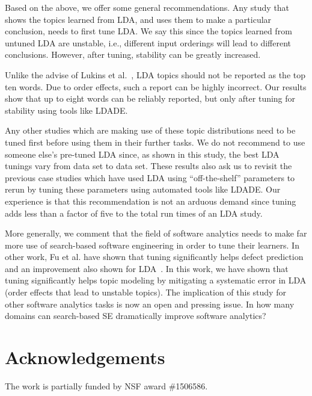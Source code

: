 \documentclass[twocolumn,5p,sort&compress]{elsarticle}
\theoremstyle{break}
\begin{document}
Based on the above, we offer some general recommendations. Any study that shows the topics learned from LDA, and uses them to make a particular
conclusion, needs to first tune LDA. We say this since the topics learned from untuned LDA are unstable, i.e., different input orderings will lead to different conclusions. However, after tuning, stability can be greatly increased.

Unlike the advise of Lukins et al.~\cite{lukins2010bug}, LDA topics should not be reported as the top ten words.
  Due to order effects, such a report can be highly incorrect.
  Our results show that up to eight words can be reliably reported, but only
  after tuning for stability using tools like LDADE.

Any other studies which are making use of these topic distributions need to be tuned first before using them in their further tasks. We do not recommend to use someone else's pre-tuned LDA since, as shown in this study,  the best LDA tunings vary from data set to data set. These results also ask us to revisit the previous case studies which have used LDA using ``off-the-shelf'' parameters to rerun by tuning these parameters using automated tools like LDADE. Our experience is that this recommendation is not an arduous demand since tuning adds less than a factor of five to the total run times of an LDA study.

More generally, we comment that the field of software analytics needs to make far more use of search-based software engineering in order
to tune their learners. In other work, Fu et al. have shown that tuning significantly helps defect prediction~\cite{fu2016tuning} and an improvement also shown for LDA~\cite{panichella2013effectively}. In this work, we have shown that tuning significantly helps topic modeling by mitigating a systematic error in LDA  (order effects that lead to unstable topics). The implication of this study for other software analytics tasks is now an open
and pressing issue. 
In how many domains can search-based SE dramatically improve software analytics?


\section*{Acknowledgements}
		The work is partially funded by NSF award \#1506586.
	
\balance

\medskip

%


\end{document}

